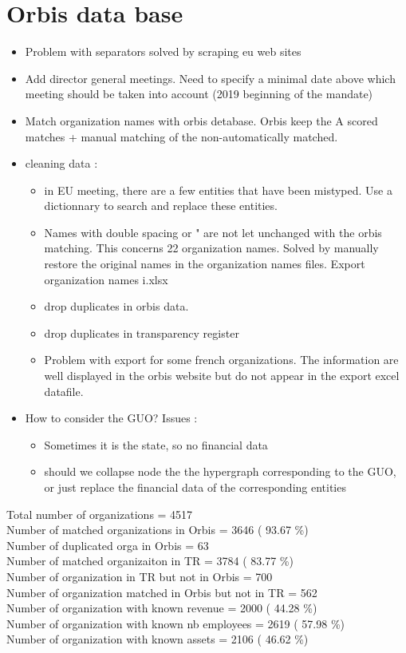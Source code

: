 \documentclass[ 11pt]{article}
\begin{document}
\section{Orbis data base}
\begin{itemize}
	\item Problem with separators solved by scraping eu web sites
	\item Add director general meetings. Need to specify a minimal date above which meeting should be taken into account (2019 beginning  of the mandate)
	\item Match organization names with orbis detabase. Orbis keep the A scored matches + manual matching of the non-automatically matched.
	
	\item cleaning data : 
		\begin{itemize}
		\item in EU meeting, there are a few entities that have been mistyped. Use a dictionnary to search and replace these entities.
		\item Names with double spacing or " are not let unchanged with the orbis matching. This concerns 22 organization names.  Solved by manually restore the original names in the organization names files.  Export organization names i.xlsx
		\item drop duplicates in orbis data. 
		\item drop duplicates in transparency register
		\item Problem with export for some french organizations. The information are well displayed in the orbis website but do not appear in the export excel datafile.
		
		\end{itemize}
		\item How to consider the GUO? Issues :
		\begin{itemize}
			\item Sometimes it is the state, so no financial data
			\item should we collapse node the the hypergraph corresponding to the GUO, or just replace the financial data of the corresponding entities
		\end{itemize}

\end{itemize}
Total number of organizations =  4517 \\
Number of matched organizations in Orbis =  3646 ( 93.67 \%) \\
Number of duplicated orga in Orbis =  63 \\
Number of matched organizaiton in TR =  3784 ( 83.77 \%) \\
Number of organization in TR but not in Orbis =  700 \\
Number of organization matched in Orbis but not in TR =  562 \\
Number of organization with known revenue =  2000 ( 44.28 \%) \\
Number of organization with known nb employees =  2619 ( 57.98 \%) \\
Number of organization with known assets =  2106 ( 46.62 \%) \\
\end{document}
